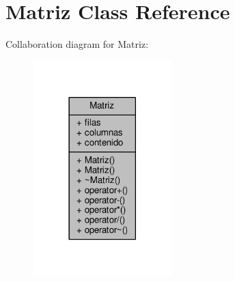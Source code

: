\hypertarget{class_matriz}{\section{Matriz Class Reference}
\label{class_matriz}
}


Collaboration diagram for Matriz\+:
\nopagebreak
\begin{figure}[H]
\begin{center}
\leavevmode
\includegraphics[width=153pt]{class_matriz__coll__graph}
\end{center}
\end{figure}
